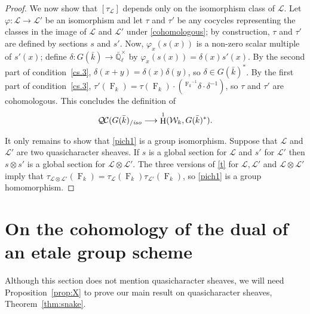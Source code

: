 \documentclass[11pt]{amsart}
\theoremstyle{plain}
\theoremstyle{definition}
\theoremstyle{remark}
\newcommand{\EE}{\mathbb{\bar Q}_\ell}
\newcommand{\bFq}{\bar{k}}
\newcommand{\Fq}{k}
\newcommand{\EEx}{\EE^\times}
\newcommand{\Frob}[1]{{\operatorname{F}_{#1}}}
\DeclareMathOperator{\Hom}{Hom}
\DeclareMathOperator{\Hh}{H}
\newcommand{\cs}[1]{{\mathcal{#1}}}
\newcommand{\QC}{{\mathcal{Q\hskip-0.8pt C}}}
\newcommand{\QCiso}[1]{\QC(#1)_{/\textit{iso}}}
\newcommand{\Weil}[1]{\mathcal{W}_{#1}}
\newcommand\Clifton[1]{\marginpar{\smaller\smaller CC: #1}}
\begin{document}
\begin{proof}
  We now show that $[\tau_\cs{L}]$ depends only on the isomorphism class of $\cs{L}$.
  Let $\varphi : \cs{L} \to \cs{L'}$ be an isomorphism and
  let $\tau$ and $\tau'$ be any cocycles representing the classes in the
  image of $\cs{L}$ and $\cs{L'}$ under \eqref{cohomologous}; by construction,
  $\tau$ and $\tau'$ are defined by sections $s$ and $s'$. Now, $\varphi_x(s(x))$ is a
  non-zero scalar multiple of $s'(x)$; define $\delta: G(\bFq) \to \EEx$
  by $\varphi_x(s(x)) = \delta(x) s'(x)$.
  By the second part of condition~\ref{cs.3},
  $\delta(x+y) = \delta(x)\delta(y)$, so $\delta \in G(\bFq)^*$. By the first part of
  condition~\ref{cs.3}, $\tau'(\Frob{\Fq}) = \tau(\Frob{\Fq}) \cdot (\,^{\Frob{\Fq}^{-1}}\delta \cdot \delta^{-1})$,
  so $\tau$ and $\tau'$ are cohomologous. This concludes the definition of
  \begin{equation}\label{pich1}
    \QCiso{G(\bFq} \longrightarrow \Hh^1(\Weil{\Fq},G(\bFq)^*).
  \end{equation}

  It only remains to show that \eqref{pich1} is a group
  isomorphism.  Suppose that $\cs{L}$ and $\cs{L}'$ are two quasicharacter sheaves.
  If $s$ is a global section for $\cs{L}$ and $s'$ for $\cs{L}'$ then $s \otimes s'$ is a global section for
  $\cs{L} \otimes \cs{L}'$.  The three versions of \eqref{t} for $\cs{L}, \cs{L'}$ and $\cs{L} \otimes \cs{L}'$ imply that
  $\tau_{\cs{L} \otimes \cs{L}'}(\Frob{k}) = \tau_\cs{L}(\Frob{k}) \tau_{\cs{L}'}(\Frob{k})$, so \eqref{pich1} is a group homomorphism.
\Clifton{I'm working on this.}
\end{proof}


\section{On the cohomology of the dual of an etale group scheme}
%

Although this section does not mention quasicharacter sheaves, 
we will need Proposition~\ref{prop:X} to prove our main result on quasicharacter sheaves, 
Theorem~\ref{thm:snake}.
\end{document}
